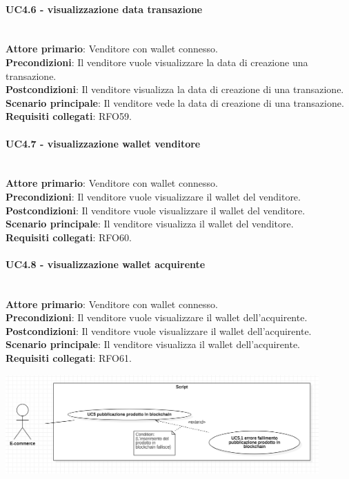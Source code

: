 \documentclass[a4paper, 12pt]{article}
\begin{document}
\paragraph{UC4.6 - visualizzazione data transazione}\\
\textbf{Attore primario}: Venditore con wallet connesso.\\
\textbf{Precondizioni}: Il venditore vuole visualizzare la data di creazione una transazione.\\
\textbf{Postcondizioni}: Il venditore visualizza la data di creazione di una transazione.\\
\textbf{Scenario principale}: Il venditore vede la data di creazione di una transazione.\\
\textbf{Requisiti collegati}: RFO59.

\paragraph{UC4.7 - visualizzazione wallet venditore}\\
\textbf{Attore primario}: Venditore con wallet connesso.\\
\textbf{Precondizioni}: Il venditore vuole visualizzare il wallet del venditore.\\
\textbf{Postcondizioni}: Il venditore vuole visualizzare il wallet del venditore.\\
\textbf{Scenario principale}: Il venditore visualizza il wallet del venditore.\\
\textbf{Requisiti collegati}: RFO60.

\paragraph{UC4.8 - visualizzazione wallet acquirente}\\
\textbf{Attore primario}: Venditore con wallet connesso.\\
\textbf{Precondizioni}: Il venditore vuole visualizzare il wallet dell'acquirente.\\
\textbf{Postcondizioni}: Il venditore vuole visualizzare il wallet dell'acquirente.\\
\textbf{Scenario principale}: Il venditore visualizza il wallet dell'acquirente.\\
\textbf{Requisiti collegati}: RFO61.

\includegraphics[width=0.9\textwidth]{UC_script}
\end{document}
